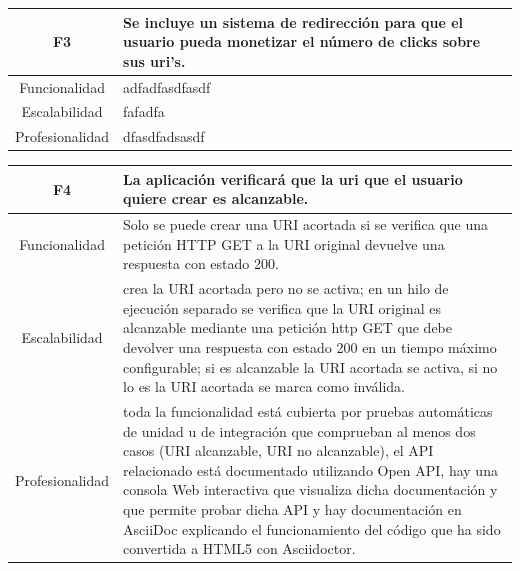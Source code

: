 \documentclass{article}
\begin{document}
\begin{table}[hbtp]
    \footnotesize
    \centering
    \settowidth{}
    \setlength\extrarowheight{5pt}
    \begin{tabulary}{\textwidth}{ C L }
        \textbf{F3} & Se incluye un sistema de redirección para que el usuario pueda monetizar el número de clicks sobre sus uri's.
        \\
    \hline
    
    Funcionalidad & adfadfasdfasdf\\
        
    Escalabilidad & fafadfa \\

    Profesionalidad & dfasdfadsasdf \\

    \end{tabulary}
\end{table}

\begin{table}[hbtp]
    \footnotesize
    \centering
    \settowidth{}
    \setlength\extrarowheight{5pt}
    \begin{tabulary}{\textwidth}{ C L }
        \textbf{F4} & La aplicación verificará que la uri que el usuario quiere crear es alcanzable. 
        \\
    \hline
    
    Funcionalidad & Solo se puede crear una URI acortada si se verifica que una petición HTTP GET
    a la URI original devuelve una respuesta con estado 200.\\
        
    Escalabilidad & crea la URI acortada pero no se activa; en un hilo de ejecución separado se
    verifica que la URI original es alcanzable mediante una petición http GET que debe devolver
    una respuesta con estado 200 en un tiempo máximo configurable; si es alcanzable la URI
    acortada se activa, si no lo es la URI acortada se marca como inválida. \\

    Profesionalidad & toda la funcionalidad está cubierta por pruebas automáticas de unidad u de
    integración que comprueban al menos dos casos (URI alcanzable, URI no alcanzable), el API
    relacionado está documentado utilizando Open API, hay una consola Web interactiva que
    visualiza dicha documentación y que permite probar dicha API y hay documentación en
    AsciiDoc explicando el funcionamiento del código que ha sido convertida a HTML5 con
    Asciidoctor.
    \end{tabulary}
    
\end{table}
 
\end{document}
